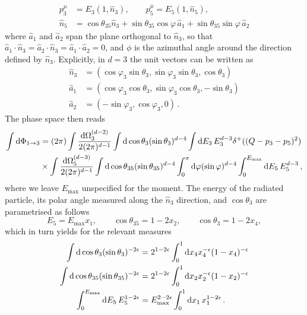 \documentclass[a4paper,11pt]{article}
\begin{document}
\begin{align}
p^\mu_3 &= E_3(1,\hat{n}_3),\quad\quad
p^\mu_5 = E_5(1,\hat{n}_5),\quad\quad \\
\hat{n}_5 &= 
\cos\theta_{35}\hat{n}_3 + \sin\theta_{35}\cos\varphi\,\hat{a}_1
 + \sin\theta_{35}\sin\varphi\,\hat{a}_2
\end{align}
where $\hat{a}_1$ and $\hat{a}_2$ span the plane orthogonal to $\hat{n}_3$,
so that $\hat{a}_1\cdot\hat{n}_3 = \hat{a}_2\cdot\hat{n}_3 = \hat{a}_1\cdot\hat{a}_2 = 0$, and $\phi$ is the azimuthal angle around the
direction defined by $\hat{n}_3$.
Explicitly, in $d=3$ the unit vectors can be written as
\begin{align}
\hat{n}_3 &= 
(\cos\varphi_3\sin\theta_3,\sin\varphi_3\sin\theta_3,\cos\theta_3) \\
\hat{a}_1 &= (\cos\varphi_3\cos\theta_3,\sin\varphi_3\cos\theta_3,-\sin\theta_3)\\
\hat{a}_2 &= (-\sin\varphi_3,\cos\varphi_3,0)\, .
\end{align}
%
The phase space then reads
\begin{align}
\int \mathrm d\Phi_{1\to 3} &= 
(2\pi)\int \frac{\mathrm d\Omega^{(d-2)}_{3}}{2(2\pi)^{d-1}}\int\mathrm d\cos\theta_3 (\sin\theta_3)^{d-4} \int\mathrm d E_3 \, E^{d-3}_3 \delta^{+}((Q-p_3-p_5)^2) 
\nonumber \\
&\times
\int \frac{\mathrm d\Omega^{(d-3)}_{5}}{2(2\pi)^{d-1}}\int\mathrm d\cos\theta_{35} (\sin\theta_{35})^{d-4}\int^{\pi}_0 \mathrm d\varphi(\sin\varphi)^{d-4}
\int^{E_{\max}}_0 \mathrm d E_5 \, E^{d-3}_5\,,
\end{align}
where we leave $E_{\max}$ unspecified for the moment.
The energy of the radiated particle, its polar angle measured along the $\hat{n}_3$ direction, and $\cos\theta_3$ are parametrised as follows
\begin{equation}
E_5 = E_{\max} x_1, \quad\quad
\cos\theta_{35} = 1 - 2 x_2, \quad\quad
\cos\theta_{3}  = 1 - 2 x_4,
\end{equation}
which in turn yields for the relevant measures
\begin{align}
\int\mathrm d\cos\theta_{3} (\sin\theta_{3})^{-2\epsilon} &= 
2^{1-2\epsilon} \int^1_0 \mathrm d x_4 x_4^{-\epsilon}(1-x_4)^{-\epsilon} \\
\int\mathrm d\cos\theta_{35} (\sin\theta_{35})^{-2\epsilon} &= 
2^{1-2\epsilon} \int^1_0 \mathrm d x_2 x_2^{-\epsilon}(1-x_2)^{-\epsilon} \\
\int^{E_{\max}}_0 \mathrm d E_5 \, E_5^{1-2\epsilon} &= E_{\max}^{2-2\epsilon}
\int^1_0 \mathrm d x_1 \, x_1^{1-2\epsilon}\, .
\end{align}
\end{document}
